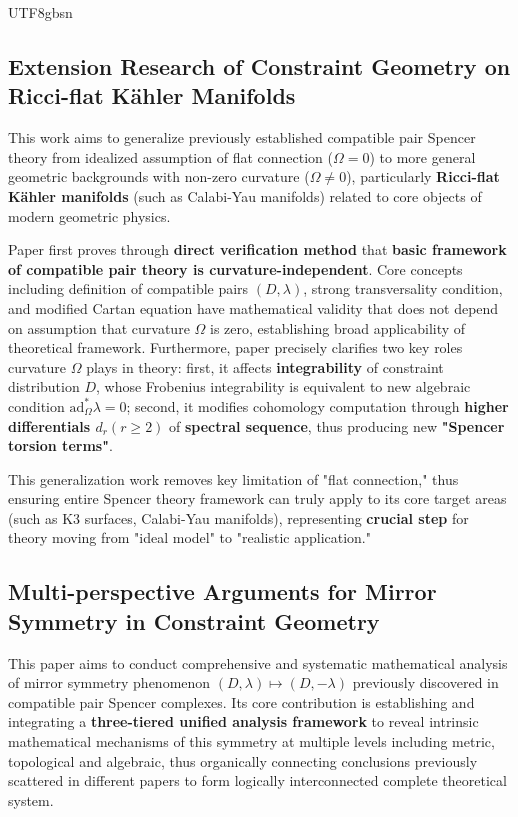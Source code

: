 \documentclass[a4paper,12pt]{extarticle}
\theoremstyle{definition}
\begin{document}
\begin{CJK}{UTF8}{gbsn}
\subsection{Extension Research of Constraint Geometry on Ricci-flat Kähler Manifolds \cite{zheng2025extend}}
\label{subsec:roadmap_extend}
This work \cite{zheng2025extend} aims to generalize previously established compatible pair Spencer theory from idealized assumption of flat connection ($\Omega=0$) to more general geometric backgrounds with non-zero curvature ($\Omega \neq 0$), particularly \textbf{Ricci-flat Kähler manifolds} (such as Calabi-Yau manifolds) related to core objects of modern geometric physics.

Paper first proves through \textbf{direct verification method} that \textbf{basic framework of compatible pair theory is curvature-independent}. Core concepts including definition of compatible pairs $(D, \lambda)$, strong transversality condition, and modified Cartan equation have mathematical validity that does not depend on assumption that curvature $\Omega$ is zero, establishing broad applicability of theoretical framework. Furthermore, paper precisely clarifies two key roles curvature $\Omega$ plays in theory: first, it affects \textbf{integrability} of constraint distribution $D$, whose Frobenius integrability is equivalent to new algebraic condition $\mathrm{ad}_{\Omega}^{*}\lambda=0$; second, it modifies cohomology computation through \textbf{higher differentials $d_r (r\geq2)$} of \textbf{spectral sequence}, thus producing new \textbf{"Spencer torsion terms"}.

This generalization work removes key limitation of "flat connection," thus ensuring entire Spencer theory framework can truly apply to its core target areas (such as K3 surfaces, Calabi-Yau manifolds), representing \textbf{crucial step} for theory moving from "ideal model" to "realistic application."

\subsection{Multi-perspective Arguments for Mirror Symmetry in Constraint Geometry \cite{zheng2025analytic}}
\label{subsec:roadmap_analytic}
This paper \cite{zheng2025analytic} aims to conduct comprehensive and systematic mathematical analysis of mirror symmetry phenomenon $(D,\lambda)\mapsto(D,-\lambda)$ previously discovered in compatible pair Spencer complexes. Its core contribution is establishing and integrating a \textbf{three-tiered unified analysis framework} to reveal intrinsic mathematical mechanisms of this symmetry at multiple levels including metric, topological and algebraic, thus organically connecting conclusions previously scattered in different papers to form logically interconnected complete theoretical system.


\end{CJK}
\end{document}
